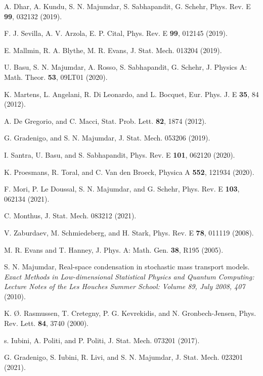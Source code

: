 \documentclass[aps,pre,twocolumn,superscriptaddress,showpacs]{revtex4-1}
\begin{document}
\begin{thebibliography}{10}
 A. Dhar, A. Kundu, S. N. Majumdar, S. Sabhapandit, G. Schehr, Phys. Rev. E {\bf 99}, 032132 (2019).

F. J. Sevilla, A. V. Arzola, E. P. Cital, Phys. Rev. E {\bf 99}, 012145 (2019).%

 E. Mallmin, R. A. Blythe, M. R. Evans, J. Stat. Mech. 013204 (2019).

U. Basu, S. N. Majumdar, A. Rosso, S. Sabhapandit, G. Schehr, J. Physics A: Math. Theor. {\bf 53}, 09LT01 (2020).%

 K. Martens, L. Angelani, R. Di Leonardo, and L. Bocquet, Eur. Phys. J. E {\bf 35}, 84 (2012).

 A. De Gregorio, and C. Macci, Stat. Prob. Lett. {\bf 82}, 1874 (2012).

 G. Gradenigo, and S. N. Majumdar, J. Stat. Mech. 053206 (2019).

 I. Santra, U. Basu, and S. Sabhapandit, Phys. Rev. E {\bf 101}, 062120 (2020).

 K. Proesmans, R. Toral, and C. Van den Broeck, Physica A {\bf 552}, 121934 (2020).  

 F. Mori, P. Le Doussal, S. N. Majumdar, and G. Schehr, Phys. Rev. E {\bf 103}, 062134 (2021).


 C. Monthus, J. Stat. Mech. 083212 (2021).


 V. Zaburdaev, M. Schmiedeberg, and H. Stark, Phys. Rev. E {\bf 78}, 011119 (2008).

 M. R. Evans and T. Hanney, J. Phys. A: Math. Gen. {\bf 38}, R195 (2005).

 S. N. Majumdar,  Real-space condensation in stochastic mass transport models. \emph{Exact Methods in Low-dimensional Statistical Physics and Quantum Computing: Lecture Notes of the Les Houches Summer School: Volume 89, July 2008, 407} (2010).

 K. {\O}. Rasmussen, T. Cretegny, P. G. Kevrekidis, and N. Gronbech-Jensen, Phys. Rev. Lett. {\bf 84}, 3740 (2000).

 s. Iubini, A. Politi, and P. Politi, J. Stat. Mech. 073201 (2017).

 G. Gradenigo, S. Iubini, R. Livi, and S. N. Majumdar, J. Stat. Mech. 023201 (2021).


\end{thebibliography}
\end{document}
